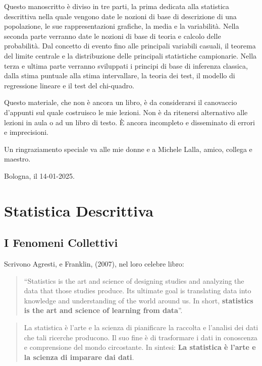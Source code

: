 \documentclass[
  11pt,
]{book}
\theoremstyle{mytheoremstyle}
\theoremstyle{mydefstyle}
\begin{document}
Questo manoscritto è diviso in tre parti, la prima dedicata alla statistica descrittiva nella quale
vengono date le nozioni di base di descrizione di una popolazione, le sue rappresentazioni grafiche,
la media e la variabilità. Nella seconda parte verranno date le nozioni di base di teoria e calcolo delle probabilità.
Dal concetto di evento fino alle principali variabili casuali, il teorema del limite centrale e la distribuzione
delle principali statistiche campionarie. Nella terza e ultima parte verranno sviluppati
i principi di base di inferenza classica, dalla stima puntuale alla stima intervallare, la teoria dei test,
il modello di regressione lineare e il test del chi-quadro.

Questo materiale, che non è ancora un libro, è da considerarsi il canovaccio d'appunti sul quale
costruisco le mie lezioni. Non è da ritenersi alternativo alle lezioni in aula o ad un libro di testo.
È ancora incompleto e disseminato di errori e imprecisioni.

Un ringraziamento speciale va alle mie donne e a Michele Lalla, amico, collega e maestro.

Bologna, il 14-01-2025.

\part{Statistica Descrittiva}

\chapter{I Fenomeni Collettivi}\label{i-fenomeni-collettivi}

Scrivono Agresti, e Franklin, (2007), nel loro celebre libro:

\begin{quote}
``Statistics is the art and science of designing studies and analyzing the data that those studies produce. Its ultimate goal is translating data into knowledge and understanding of the world around us. In short, \textbf{statistics is the art and science of learning from data}''.
\end{quote}

\begin{quote}
La statistica è l'arte e la scienza di pianificare la raccolta e l'analisi dei dati che tali ricerche producono. Il suo fine è di trasformare i dati in conoscenza e comprensione del mondo circostante. In sintesi: \textbf{La statistica è l'arte e la scienza di imparare dai dati}.
\end{quote}
\end{document}
